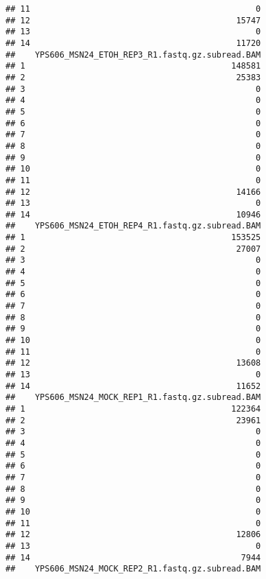 \documentclass[
]{book}
\begin{document}
\begin{verbatim}
## 11                                              0
## 12                                          15747
## 13                                              0
## 14                                          11720
##    YPS606_MSN24_ETOH_REP3_R1.fastq.gz.subread.BAM
## 1                                          148581
## 2                                           25383
## 3                                               0
## 4                                               0
## 5                                               0
## 6                                               0
## 7                                               0
## 8                                               0
## 9                                               0
## 10                                              0
## 11                                              0
## 12                                          14166
## 13                                              0
## 14                                          10946
##    YPS606_MSN24_ETOH_REP4_R1.fastq.gz.subread.BAM
## 1                                          153525
## 2                                           27007
## 3                                               0
## 4                                               0
## 5                                               0
## 6                                               0
## 7                                               0
## 8                                               0
## 9                                               0
## 10                                              0
## 11                                              0
## 12                                          13608
## 13                                              0
## 14                                          11652
##    YPS606_MSN24_MOCK_REP1_R1.fastq.gz.subread.BAM
## 1                                          122364
## 2                                           23961
## 3                                               0
## 4                                               0
## 5                                               0
## 6                                               0
## 7                                               0
## 8                                               0
## 9                                               0
## 10                                              0
## 11                                              0
## 12                                          12806
## 13                                              0
## 14                                           7944
##    YPS606_MSN24_MOCK_REP2_R1.fastq.gz.subread.BAM

\end{verbatim}
\end{document}
